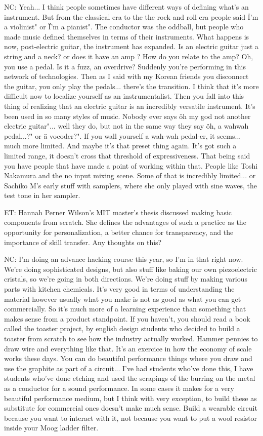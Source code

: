 NC: Yeah... I think people sometimes have different ways of defining what's an instrument. But from the classical era to the the rock and roll era people said \"I'm a violinist" or \" I'm a pianist". The conductor was the oddball, but people who made music defined themselves in terms of their instruments. What happens is now, post-electric guitar, the instrument has expanded. Is an electric guitar just a string and a neck? or does it have an amp ? How do you relate to the amp? Oh, you use a pedal. Is it a fuzz, an overdrive? Suddenly you're performing in this network of technologies. Then as I said with my Korean friends you disconnect the guitar, you only play the pedals... there's the transition. I think that it's more difficult now to localize yourself as an instrumentalist. Then you fall into this thing of realizing that an electric guitar is an incredibly versatile instrument. It's been used in so many styles of music. Nobody ever says \"oh my god not another electric guitar"... well they do, but not in the same way they say \"oh, a wahwah pedal...?" or \"a vocoder?". If you wall yourself a wah-wah pedal-er, it seems... much more limited. And maybe it's that preset thing again. It's got such a limited range, it doesn't cross that threshold of expressiveness. That being said you have people that have made a point of working within that. People like Toshi Nakamura and the no input mixing scene. Some of that is incredibly limited... or Sachiko M's early stuff with samplers, where she only played with sine waves, the test tone in her sampler. 

ET: Hannah Perner Wilson's MIT master's thesis discussed making basic components from scratch. She defines the advantages of such a practice as the opportunity for personalization, a better chance for transparency, and the importance of skill transfer. Any thoughts on this? 

NC: I'm doing an advance hacking course this year, so I'm in that right now. We're doing sophisticated designs, but also stuff like baking our own piezoelectric cristals, so we're going in both directions. We're doing stuff by making various parts with kitchen chemicals. It's very good in terms of understanding the material however usually what you make is not as good as what you can get commercially. So it's much more of a learning experience than something that makes sense from a product standpoint. If you haven't, you should read a book called the toaster project, by english design students who decided to build a toaster from scratch to see how the industry actually worked. Hammer pennies to draw wire and everything like that. It's an exercice in how the economy of scale works these days. You can do beautiful performance things where you draw and use the graphite as part of a circuit... I've had students who've done this, I have students who've done etching and used the scrapings of the burring on the metal as a conductor for a sound performance. In some cases it makes for a very beautiful performance medium, but I think with very exception, to build these as substitute for commercial ones doesn't make much sense. Build a wearable circuit because you want to interact with it, not because you want to put a wool resistor inside your Moog ladder filter. 

